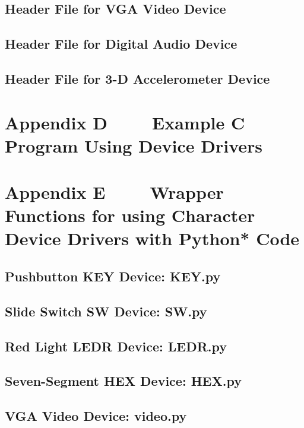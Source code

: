 \documentclass[11pt, twoside, pdftex]{article}
\begin{document}
\subsection*{Header File for VGA Video Device}

\newpage
\subsection*{Header File for Digital Audio Device}

\newpage
\subsection*{Header File for 3-D Accelerometer Device}


\newpage
\section*{Appendix D~~~~ Example C Program Using Device Drivers}



\newpage
\section*{Appendix E~~~~ Wrapper Functions for using Character Device Drivers with Python* Code}

\subsection*{Pushbutton KEY Device: KEY.py}
\lstset{language=Python,numbers=none}

\newpage
\subsection*{Slide Switch SW Device: SW.py}

\newpage
\subsection*{Red Light LEDR Device: LEDR.py}

\newpage
\subsection*{Seven-Segment HEX Device: HEX.py}

\newpage
\subsection*{VGA Video Device: video.py}

\newpage
\end{document}
